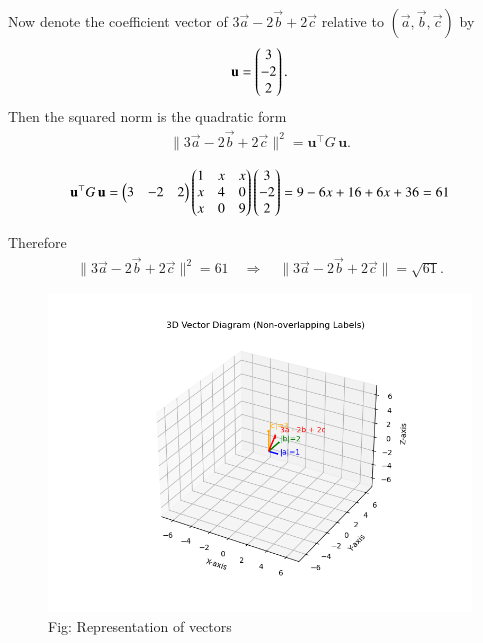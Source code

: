 \documentclass[journal]{IEEEtran}
\begin{document}
Now denote the coefficient vector of $3\vec a-2\vec b+2\vec c$ relative to $(\vec a,\vec b,\vec c)$ by
\begin{align}
\mathbf{u}=\begin{pmatrix}3\\-2\\2\end{pmatrix}.
\end{align}
Then the squared norm is the quadratic form
\begin{align}
\bigl\lVert 3\vec a-2\vec b+2\vec c\bigr\rVert^2
= \mathbf{u}^\top G\,\mathbf{u}.
\end{align}

\begin{align}
\mathbf{u}^\top G\, \mathbf{u}
=\begin{pmatrix}3 & -2 & 2\end{pmatrix}
\begin{pmatrix}1 & x & x\\
x & 4 & 0\\
x & 0 & 9\end{pmatrix}
\begin{pmatrix}3\\-2\\2 \end{pmatrix}
=9 -6x +16 +6x +36 =61
\end{align}

Therefore
\begin{align}
\bigl\lVert 3\vec a-2\vec b+2\vec c\bigr\rVert^2 = 61
\quad\Longrightarrow\quad
\boxed{\bigl\lVert 3\vec a-2\vec b+2\vec c\bigr\rVert=\sqrt{61}}.
\end{align}
\pagebreak
\begin{figure}[h!]
  \centering
  \includegraphics[width=0.9\columnwidth]{figs/fig3.png} 
   \caption*{Fig: Representation of vectors}
  \label{Fig3}
\end{figure}
\end{document}

